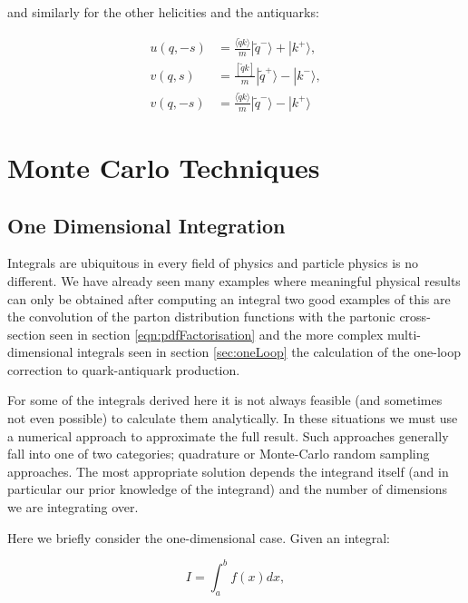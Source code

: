 		and similarly for the other helicities and the antiquarks:

		\begin{subequations}
		\begin{align}
			u(q, -s) &= \frac{\langle \widetilde{q}k\rangle}{m}|\widetilde{q}^-\rangle + |k^+\rangle, \\
			v(q,  s) &= \frac{[\widetilde{q}k]}{m}|\widetilde{q}^+\rangle - |k^-\rangle, \\
			v(q, -s) &= \frac{\langle \widetilde{q}k\rangle}{m}|\widetilde{q}^-\rangle - |k^+\rangle
		\end{align}
		\end{subequations}

\section{Monte Carlo Techniques}
	\label{sec:MC}

	\subsection{One Dimensional Integration}
	\label{sub:MCOneD}

	Integrals are ubiquitous in every field of physics and particle physics is no different.  We have already seen many examples where meaningful physical results
	can only be obtained after computing an integral two good examples of this are the convolution of the parton distribution functions with the partonic
	cross-section seen in section \ref{eqn:pdfFactorisation} and the more complex multi-dimensional integrals seen in section \ref{sec:oneLoop} the calculation
	of the one-loop correction to quark-antiquark production.

	For some of the integrals derived here it is not always feasible (and sometimes not even possible) to calculate them analytically.  In these situations
	we must use a numerical approach to approximate the full result.  Such approaches generally fall into one of two categories; quadrature
	or Monte-Carlo random sampling approaches.  The most appropriate solution depends the integrand itself (and in particular our prior knowledge of
	the integrand) and the number of dimensions we are integrating over.

	Here we briefly consider the one-dimensional case.  Given an integral:

	\begin{equation}
		I = \int_a^b f(x)dx,
		\label{eqn:1DIntegral}
	\end{equation}

